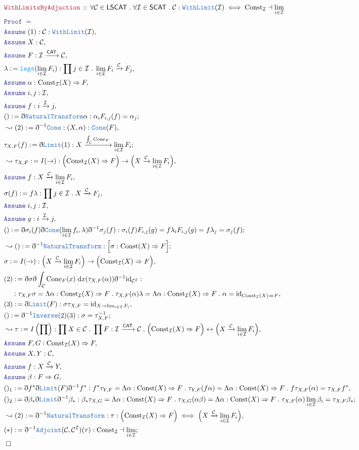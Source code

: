 \documentclass[12pt]{scrartcl}
\newcommand{\TYPE}[1]{\textcolor{NavyBlue}{\mathtt{#1}}}
\newcommand{\FUNC}[1]{\textcolor{Cerulean}{\mathtt{#1}}}
\newcommand{\LOGIC}[1]{\textcolor{Blue}{\mathtt{#1}}}
\newcommand{\THM}[1]{\textcolor{Maroon}{\mathtt{#1}}}
\renewcommand{\.}{\; . \;}
\newcommand{\de}{: \kern 0.1pc =}
\newcommand{\Theorem}[2]{& \THM{#1} \, :: \, #2 \\ & \Proof = \\ }
\newcommand{\NewLine}{\\ & \kern 1pc}
\newcommand{\Page}[1]{ \begin{align*} #1 \end{align*}   }
\newcommand{ \bd }{ \ByDef }
\DeclareMathOperator*{\id}{id}
\newcommand{\ToBij}{\leftrightarrow}
\newcommand{\Arrow}{\xrightarrow}
\newcommand{\Say}[3]{& #1 \de #2 : #3, \\}
\newcommand{\Conclude}[3]{& #1 \de #2 : #3; \\}
\newcommand{\Derive}[3]{& \leadsto #1 \de #2 : #3, \\}
\newcommand{\DeriveConclude}[3]{& \leadsto #1 \de #2 : #3 ; \\}
\newcommand{\Assume}[2]{& \LOGIC{Assume} \; #1 : #2, \\}
\newcommand{\QED}{\; \square}
\newcommand{\EndProof}{& \QED \\}
\newcommand{\ByDef}{\eth}
\newcommand{\Proof}{\LOGIC{Proof} \; }
\newcommand{\NT}{\TYPE{NaturalTransform}}
\newcommand{\C}{\mathcal{C}}
\newcommand{\I}{\mathcal{I}}
\newcommand{\CAT}{\mathsf{CAT}}
\begin{document}
\Page{
	\Theorem{WithLimitsByAdjuction}{  
			\forall \C \in \mathsf{LSCAT} \. 
			\forall \I \in \mathsf{SCAT} \. 
			\C : \TYPE{WithLimit}(\I) \iff \mathrm{Const}_\I \dashv \lim_{i \in \I}	
		   }
	\Assume{(1)}{ \C : \TYPE{WithLimit}(\I)  }
	\Assume{X}{\C}
	\Assume{F}{\I \Arrow{\CAT} \C}
	\Say{\lambda}{\FUNC{legs}(\lim_{i \in \I} F_i)}{\prod j \in \I \. \lim_{i \in \I} F_i \Arrow{\C} F_j   }
	\Assume{\alpha}{ \mathrm{Const}_\I(X) \Rightarrow F  }
	\Assume{i,j}{\I}
	\Assume{ f }{i \Arrow{\I} j}
	\Conclude{()}{\bd \NT \alpha }{  \alpha_i F_{i,j}(f)  = \alpha_j   }
	\Derive{(2)}{ \bd^{-1}\TYPE{Cone}  }{ (X,\alpha) : \TYPE{Cone}(F) }
	\Conclude{\tau_{X,F}(f)}{\bd \TYPE{Limit}(1)}{X \Arrow{\int_{\C} \mathrm{Cone}_F} \lim_{i \in \I} F_i}
	\Derive{\tau_{X,F}}{ I(\to)  }{\Big(\mathrm{Const}_\I(X) \Rightarrow F\Big) \to \Big(X \Arrow{\C} \lim_{i \in \I} F_i\Big)}
	\Assume{f}{X \Arrow{\C} \lim_{i \in \I} F_i }
	\Say{\sigma(f)}{f\lambda}{\prod j \in \I \. X \Arrow{\C} F_j  }
	\Assume{i,j}{\I}
	\Assume{ g }{ i \Arrow{\I} j} 
	\Conclude{()}{ \bd \sigma_{i}(f) \bd \TYPE{Cone}(\lim_{i \in \I} f_i, \lambda ) \bd^{-1} \sigma_j(f) }
	{ \sigma_{i}(f) F_{i,j}(g) = f \lambda_i F_{i,j}(g)  = f\lambda_j  = \sigma_j(f)   }
	\DeriveConclude{()}{\bd^{-1}\NT}{\Big[\sigma : \mathrm{Const}(X) \Rightarrow F \Big]}
	\Say{\sigma}{ I(\to) }{\Big( X \Arrow{\C} \lim_{i \in \I} F_i \Big) \to \Big(\mathrm{Const}_\I(X) \Rightarrow F \Big) }
	\Say{(2)}{ \bd \sigma \bd \int_{ \C} \mathrm{Cone}_F(x) \; \mathrm{d}x(\tau_{X,F}(\alpha)) \bd^{-1} {\id}_{\C^\I}}{
			\NewLine :
			\tau_{X,F}\sigma = 
			\Lambda \alpha : \mathrm{Const}_\I(X) \Rightarrow F \. \tau_{X,F}(\alpha)\lambda  = 
			\Lambda \alpha : \mathrm{Const}_\I(X) \Rightarrow F \. \alpha =
			{\id}_{ \mathrm{Const}_\I(X) \Rightarrow F}
		}
	\Say{(3)}{\bd \TYPE{Limit}(F) }{\sigma\tau_{X,F} = {\id}_{X \to \lim_{i \in \I} F_i}}
	\Conclude{()}{\bd^{-1}\TYPE{Inverse}(2)(3)}{\sigma = \tau^{-1}_{X,F}}
	\Derive{\tau}{I\left( \prod \right)}{ \prod X \in \C \. \prod F : \I \Arrow{\CAT} \C \. 
		\Big(\mathrm{Const}_\I(X) \Rightarrow F\Big) \ToBij \Big(X \Arrow{\C} \lim_{i \in \I} F_i\Big)}
	\Assume{F,G}{\mathrm{Const}_\I(X) \Rightarrow F}
	\Assume{X,Y}{\C}
	\Assume{f}{X \Arrow{\C} Y}
	\Assume{\beta}{F \Rightarrow G}
	\Say{()_1}{ \bd f^* \bd \TYPE{Limit}(F) \bd^{-1} f^*  }{  
		f^* \tau_{Y,F} = 
		\Lambda \alpha : \mathrm{Const}(X) \Rightarrow F \. \tau_{Y,F}(f\alpha)  =    
		\Lambda \alpha : \mathrm{Const}(X) \Rightarrow F \.  f\tau_{X,F}(\alpha)  = 
		\tau_{X,F} f^* 
		}
	\Conclude{()_2}{\bd \beta_* \bd \TYPE{Limit} \bd^{-1}\beta_*  }
	{
		\beta_* \tau_{X,G} = 
		\Lambda \alpha : \mathrm{Const}(X) \Rightarrow F \. \tau_{X,G}(\alpha\beta) =
		\Lambda   \alpha : \mathrm{Const}(X) \Rightarrow F \. \tau_{X,F}(\alpha)\lim_{i \in \I} \beta_i =
		\tau_{X,F} \beta_*
	}
	\Derive{(2)}{\bd^{-1} \NT}
	{ \tau : \Big(\mathrm{Const}_\I(X) \Rightarrow F\Big) \iff \Big(X \Arrow{\C} \lim_{i \in \I} F_i\Big)}
	\Conclude{(*)}{\bd^{-1}\TYPE{Adjoint}(\C,\C^\I)(\tau)}{\mathrm{Const}_\I \dashv \lim_{i \in \I}}
	\EndProof
}
\end{document}
